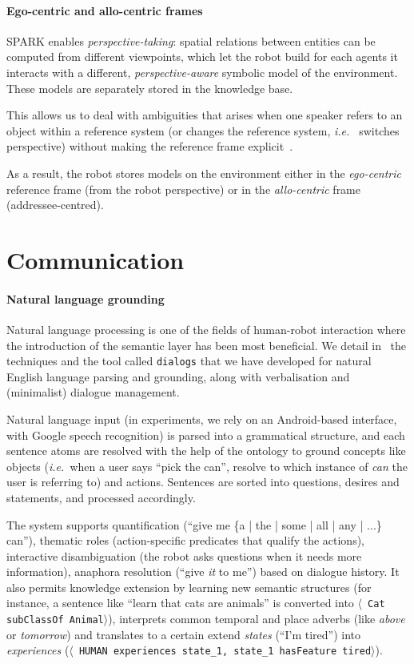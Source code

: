 \documentclass[letterpaper, 10 pt, conference]{ieeeconf}  %
\newcommand{\stmt}[1]{{\footnotesize \tt $\langle$ #1\relax$\rangle$}}
\newcommand{\ie}{{\textit{i.e.\ }}}
\begin{document}
\paragraph*{Ego-centric and allo-centric frames} SPARK enables
\emph{perspective-taking}: spatial relations between entities can be computed
from different viewpoints, which let the robot build for each agents it
interacts with a different, \emph{perspective-aware} symbolic model of the
environment. These models are separately stored in the knowledge base.

This allows us to deal with ambiguities that arises when one speaker refers to
an object within a reference system (or changes the reference system, \ie
switches perspective) without making the reference frame
explicit~\cite{Breazeal2006, Ros2010}.

As a result, the robot stores models on the environment either in the
\emph{ego-centric} reference frame (from the robot perspective) or in the
\emph{allo-centric} frame (addressee-centred).


\section{Communication}
\label{sect|com}

\paragraph*{Natural language grounding}

Natural language processing is one of the fields of human-robot interaction
where the introduction of the semantic layer has been most beneficial.
We detail in~\cite{Lemaignan2011a} the techniques and the tool called
\texttt{dialogs} that we have developed for natural English language parsing and
grounding, along with verbalisation and (minimalist) dialogue management.

Natural language input (in experiments, we rely on an Android-based interface,
with Google speech recognition) is parsed into a grammatical structure, and
each sentence atoms are resolved with the help of the ontology to ground
concepts like objects (\ie when a user says ``pick the can'', resolve to which
instance of \emph{can} the user is referring to) and actions. Sentences are
sorted into questions, desires and statements, and processed accordingly.

The system supports quantification (``give me \{a | the | some | all | any | ...\} can''),
thematic roles (action-specific predicates that qualify the actions), interactive disambiguation (the robot asks
questions when it needs more information), anaphora resolution (``give \emph{it} to me'') based on
dialogue history. It also permits knowledge extension by learning new semantic
structures (for instance, a sentence like ``learn that cats are animals'' is
converted into \stmt{Cat subClassOf Animal}), interprets common temporal and place adverbs (like \emph{above} or \emph{tomorrow}) and translates to a certain extend \emph{states} (``I'm tired'') into
\emph{experiences} (\stmt{HUMAN experiences state\_1, state\_1 hasFeature
tired}).
\end{document}
